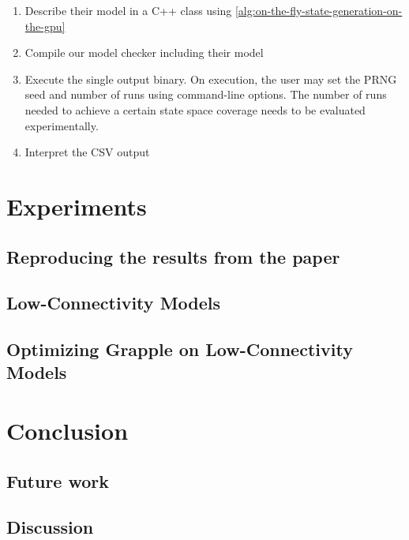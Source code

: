 \documentclass[
fancyheadings, %
%
%
]{stsreprt}
\begin{document}
\begin{enumerate}
    \item Describe their model in a C++ class using \cref{alg:on-the-fly-state-generation-on-the-gpu}
    \item Compile our model checker including their model
    \item Execute the single output binary.
          On execution, the user may set the PRNG seed and number of runs using command-line options.
          The number of runs needed to achieve a certain state space coverage needs to be evaluated experimentally.
    \item Interpret the CSV output
\end{enumerate}

\chapter{Experiments}

\section{Reproducing the results from the paper}

\section{Low-Connectivity Models}

\section{Optimizing Grapple on Low-Connectivity Models}


\chapter{Conclusion}

\section{Future work}

\section{Discussion}



\backmatter

\printbibliography[heading=bibintoc]
\end{document}
